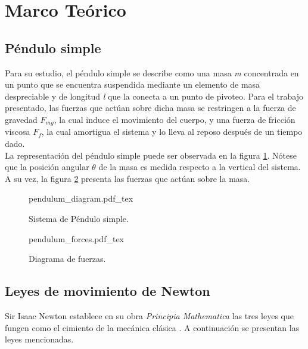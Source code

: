 \section{Marco Teórico}

\subsection{Péndulo simple}

Para su estudio, el péndulo simple se describe como una masa 
\emph{m} concentrada en un punto \cite{sastry2013nonlinear} 
que se encuentra suspendida mediante un elemento de masa 
despreciable y de longitud \emph{l} que la conecta a un 
punto de pivoteo.
Para el trabajo presentado, las fuerzas que actúan
sobre dicha masa se restringen a la fuerza de gravedad $F_{mg}$, 
la cual induce el movimiento del cuerpo, y una
fuerza de fricción viscosa $F_f$, la cual amortigua el sistema
y lo lleva al reposo después de un tiempo dado.\\

La representación del péndulo simple puede ser observada en la
figura \ref{fig: simple pendulum}. 
Nótese que la posición angular $\theta$ de la masa es medida 
respecto a la vertical del sistema.
A su vez, la figura \ref{fig: pendulum forces} presenta las fuerzas que
actúan sobre la masa.

\begin{figure}[ht]
    \centering
    {pendulum_diagram.pdf_tex}
    \caption{Sistema de Péndulo simple.}
    \label{fig: simple pendulum}
\end{figure}

 \begin{figure}[ht]
    \centering
    {pendulum_forces.pdf_tex}
    \caption{Diagrama de fuerzas.}
    \label{fig: pendulum forces}
\end{figure}


\subsection{Leyes de movimiento de Newton}

Sir Isaac Newton establece en su obra \emph{Principia Mathematica} 
las tres leyes que fungen como el cimiento de la mecánica clásica 
\cite{newton1803mathematical, díaz20183d}. 
A continuación se presentan las leyes mencionadas.

